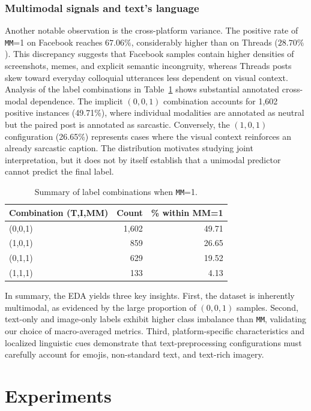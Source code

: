 \documentclass[conference]{IEEEtran}
\begin{document}
\subsubsection{Multimodal signals and text's language}
Another notable observation is the cross-platform variance. The positive rate of \texttt{MM}=1 on Facebook reaches $67.06\%$, considerably higher than on Threads ($28.70\%$). This discrepancy suggests that Facebook samples contain higher densities of screenshots, memes, and explicit semantic incongruity, whereas Threads posts skew toward everyday colloquial utterances less dependent on visual context.
Analysis of the label combinations in Table~\ref{tab:mm1-combos} shows substantial annotated cross-modal dependence. The implicit $(0,0,1)$ combination accounts for 1{,}602 positive instances (49.71\%), where individual modalities are annotated as neutral but the paired post is annotated as sarcastic. Conversely, the $(1,0,1)$ configuration (26.65\%) represents cases where the visual context reinforces an already sarcastic caption. The distribution motivates studying joint interpretation, but it does not by itself establish that a unimodal predictor cannot predict the final label.
\begin{table}[t]
\centering
\footnotesize
\setlength{\tabcolsep}{4pt}
\begin{tabular}{lrr}
\toprule
\textbf{Combination (T,I,MM)} & \textbf{Count} & \textbf{\% within MM=1} \\
\midrule
(0,0,1) & 1{,}602 & 49.71 \\
(1,0,1) & 859 & 26.65 \\
(0,1,1) & 629 & 19.52 \\
(1,1,1) & 133 & 4.13 \\
\bottomrule
\end{tabular}
\caption{Summary of label combinations when \texttt{MM}=1.}
\label{tab:mm1-combos}
\end{table}
In summary, the EDA yields three key insights. First, the dataset is inherently multimodal, as evidenced by the large proportion of $(0,0,1)$ samples. Second, text-only and image-only labels exhibit higher class imbalance than \texttt{MM}, validating our choice of macro-averaged metrics. Third, platform-specific characteristics and localized linguistic cues demonstrate that text-preprocessing configurations must carefully account for emojis, non-standard text, and text-rich imagery.
\section{Experiments}
\label{sec:experiments}
\end{document}
